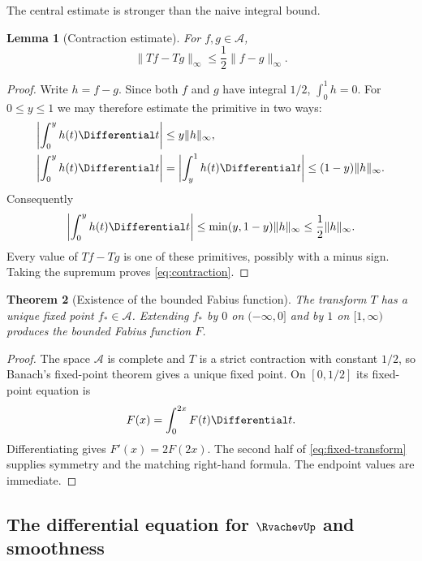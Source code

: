 \documentclass[11pt,oneside]{article}
\newtheorem{theorem}{Theorem}[section]
\newtheorem{lemma}[theorem]{Lemma}
\theoremstyle{definition}
\theoremstyle{remark}
\begin{document}
The central estimate is stronger than the naive integral bound.

\begin{lemma}[Contraction estimate]
For $f,g\in\mathcal A$,
\begin{equation}
 \|Tf-Tg\|_\infty\le\frac12\|f-g\|_\infty.                \label{eq:contraction}
\end{equation}
\end{lemma}

\begin{proof}
Write $h=f-g$.  Since both $f$ and $g$ have integral $1/2$,
$\int_0^1h=0$.  For $0\le y\le1$ we may therefore estimate the primitive in two ways:
\begin{align*}
 \left|\int_0^y h(t)\Differential t\right|
 &\le y\|h\|_\infty,\\
 \left|\int_0^y h(t)\Differential t\right|
 &=\left|\int_y^1h(t)\Differential t\right|
 \le(1-y)\|h\|_\infty.
\end{align*}
Consequently
\begin{equation*}
 \left|\int_0^yh(t)\Differential t\right|
 \le\min(y,1-y)\|h\|_\infty\le\frac12\|h\|_\infty.
\end{equation*}
Every value of $Tf-Tg$ is one of these primitives, possibly with a minus sign.  Taking the
supremum proves \eqref{eq:contraction}.
\end{proof}

\begin{theorem}[Existence of the bounded Fabius function]
The transform $T$ has a unique fixed point $f_\ast\in\mathcal A$.  Extending $f_\ast$ by
$0$ on $(-\infty,0]$ and by $1$ on $[1,\infty)$ produces the bounded Fabius function $F$.
\end{theorem}

\begin{proof}
The space $\mathcal A$ is complete and $T$ is a strict contraction with constant $1/2$, so
Banach's fixed-point theorem gives a unique fixed point.  On $[0,1/2]$ its fixed-point
equation is
\begin{equation}
 F(x)=\int_0^{2x}F(t)\Differential t.                               \label{eq:F-integral-equation}
\end{equation}
Differentiating gives $F'(x)=2F(2x)$.  The second half of
\eqref{eq:fixed-transform} supplies symmetry and the matching right-hand formula.  The
endpoint values are immediate.
\end{proof}

\subsection{The differential equation for \texorpdfstring{$\RvachevUp$}{up} and smoothness}
\end{document}
